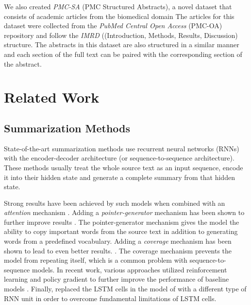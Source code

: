 \documentclass[runningheads]{llncs}
\begin{document}
We also created {\em PMC-SA} (PMC Structured Abstracts), a novel dataset that consists of academic articles from the biomedical domain The articles for this dataset were collected from the {\em PubMed Central Open Access} (PMC-OA) repository and follow the {\em IMRD} ((Introduction, Methods, Results, Discussion) structure. The abstracts in this dataset are also structured in a similar manner and each section of the full text can be paired with the corresponding section of the abstract.

\section{Related Work}

\subsection{Summarization Methods}
\label{sec:seq2seq_models}

State-of-the-art summarization methods use recurrent neural networks (RNNs) with the encoder-decoder architecture (or sequence-to-sequence architecture). These  methods usually treat the whole source text as an input sequence, encode it into their hidden state and generate a complete summary from that hidden state. 

Strong results have been achieved by such models when combined with an {\em attention} mechanism \cite{Nallapati2016AbstractiveBeyond,Chopra2016AbstractiveNetworks,Rush2015ASummarization}. Adding a {\em pointer-generator} mechanism has been shown to further improve results  \cite{See2017GetNetworks}. The pointer-generator mechanism gives the model the ability to copy important words from the source text in addition to generating words from a predefined vocabulary. Adding a {\em coverage} mechanism has been shown to lead to even better results. \cite{See2017GetNetworks}. The coverage mechanism prevents the model from repeating itself, which is a common problem with sequence-to-sequence models. In recent work, various approaches utilized reinforcement learning and policy gradient to further improve the performance of baseline models \cite{Paulus2017ASummarization,Celikyilmaz2018DeepSummarization}. Finally, \cite{Dangovski2019RotationalApplications} replaced the LSTM cells in the model of \cite{See2017GetNetworks} with a different type of RNN unit in order to overcome fundamental limitations of LSTM cells.
 
\end{document}
